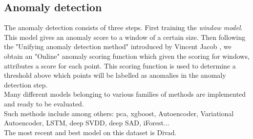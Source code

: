 \documentclass[oneside, a4paper, onecolumn, 11pt]{article}
\begin{document}
\subsection{Anomaly detection}
The anomaly detection consists of three steps. First training the \textit{window model}. This model gives an anomaly score to a window of a certain size. Then following the "Unifying anomaly detection method" introduced by Vincent Jacob \cite{Divad}, we obtain an "Online" anomaly scoring function which given the scoring for windows, attributes a score for each point. This scoring function is used to determine a threshold above which points will be labelled as anomalies in the anomaly detection step.\\
Many different models belonging to various families of methods \cite{Schmidl2022} are implemented and ready to be evaluated.\\
Such methods include among others: pca, xgboost, Autoencoder, Variational Autoencoder, LSTM, deep SVDD, deep SAD, iForest...\\
The most recent and best model on this dataset is Divad.
\end{document}
